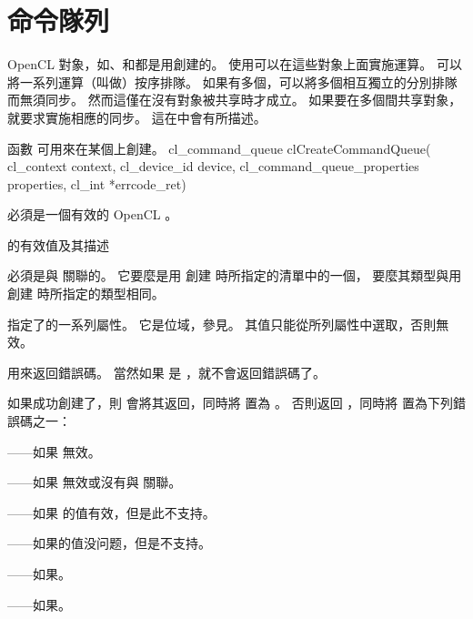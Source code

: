 \section{命令隊列}

OpenCL 對象，如、和都是用創建的。
使用可以在這些對象上面實施運算。
可以將一系列運算（叫做）按序排隊。
如果有多個，可以將多個相互獨立的分別排隊而無須同步。
然而這僅在沒有對象被共享時才成立。
如果要在多個間共享對象，就要求實施相應的同步。
這在中會有所描述。

函數  可用來在某個上創建。
\startclc
cl_command_queue clCreateCommandQueue(
			cl_context context,
			cl_device_id device,
			cl_command_queue_properties properties,
			cl_int *errcode_ret)
\stopclc

 必須是一個有效的 OpenCL 。

\startbuffer[tblcmdqprop]
的有效值及其描述
\stopbuffer
{}
{}

 必須是與  關聯的。
它要麼是用  創建  時所指定的清單中的一個，
要麼其類型與用  創建  時所指定的類型相同。

 指定了的一系列屬性。
它是位域，參見。
其值只能從所列屬性中選取，否則無效。

 用來返回錯誤碼。
當然如果  是 ，就不會返回錯誤碼了。

如果成功創建了，則  會將其返回，同時將  置為 。
否則返回 ，同時將  置為下列錯誤碼之一：
\startigBase
\item {}——如果  無效。
\item {}——如果  無效或沒有與  關聯。
\item {}——如果  的值有效，但是此不支持。
\item {}——如果的值没问题，但是不支持。
\item {}——如果\scdevfailres。
\item {}——如果\schostfailres。
\stopigBase

